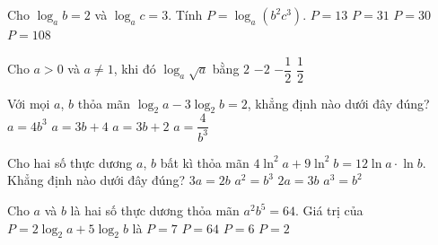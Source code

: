 \begin{ex}%
	[Mã 110 2017] Cho $\log_ab=2$ và  $\log_ac=3$. Tính $P=\log_a(b^2c^3)$.
	 \choice
		{\True $P=13$} 
		{$P=31$} 
		{$P=30$} 
		{$P=108$} 
\end{ex}

\begin{ex}%
	[MĐ 103 2020-2021 - ĐỢT 1] Cho $a>0$ và $a\ne 1$,  khi đó $\log_a\sqrt{a}$ bằng
	\choice 
		 {$2$}
		{$-2$} 
		{$-\dfrac{1}{2}$} 
		{\True  $\dfrac{1}{2}$}
\end{ex}

\begin{ex}%
	Với mọi $a$, $b$ thỏa mãn $\log_2a-3\log_2b=2$, khẳng định nào dưới  đây đúng?
	 \choice
		{\True $a=4b^3$} 
		{$a=3b+4$} 
		 {$a=3b+2$}
		 {$a=\dfrac{4}{b^3}$}
\end{ex}

\begin{ex}%
	Cho hai số thực dương $a$, $b$ bất kì thỏa mãn $4 \ln ^2 a+9 \ln ^2 b=12 \ln a \cdot \ln  b$. Khẳng định nào dưới đây đúng?
	 \choice
		{$3 a=2 b$} 
		{\True  $a^2=b^3$}
		{$2  a=3 b$}
		{$a^3=b^2$} 
\end{ex}

\begin{ex}%
	Cho $a$ và $b$ là hai số  thực dương thỏa mãn $a^2b^5 = 64$. Giá trị của $P=2\log_{2}a+5\log_{2}b$ là
	\choice 
		 {$P=7$}
		 {$P=64$}
		{\True $P=6$} 
		{$P=2$} 
\end{ex}

